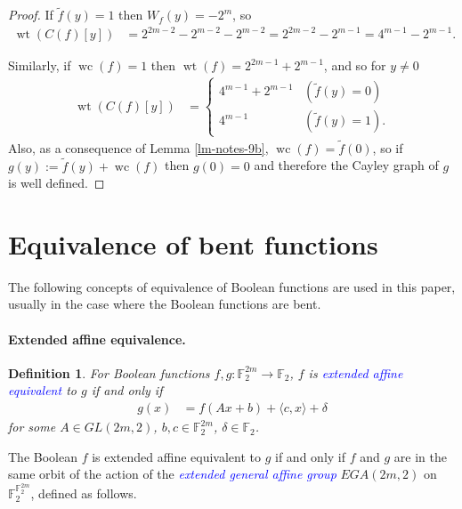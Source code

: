 \documentclass[12pt,a4paper]{article}
\newcommand{\mb}[1]{\mathbb{#1}}
\newcommand{\F}{\mb{F}}
\newcommand{\To}{\rightarrow}
\newcommand{\Emph}[1]{\emph{\textcolor{blue}{#1}}}
\newcommand{\dual}[1]{\widetilde{#1}}
\newcommand{\weight}[1]{\operatorname{wt}\left(#1\right)}
\newcommand{\weightclass}[1]{\operatorname{wc}\left(#1\right)}
\newtheorem{Definition}{Definition}
\begin{document}
\begin{proof}
If $\dual{f}(y) = 1$ then $W_f(y) = -2^m$, so
\begin{align*}
\weight{C(f)[y]}
&=
2^{2m-2}-2^{m-2} - 2^{m-2}
=
2^{2m-2} - 2^{m-1}
=
4^{m-1} - 2^{m-1}.
\end{align*}

Similarly, if $\weightclass{f} = 1$ then $\weight{f} = 2^{2m-1}+2^{m-1}$,
and so for $y \neq 0$
\begin{align*}
\weight{C(f)[y]}
&=
\begin{cases}
4^{m-1} + 2^{m-1} & (\dual{f}(y)=0)
\\
4^{m-1}           & (\dual{f}(y)=1).
\end{cases}
\end{align*}
Also, as a consequence of Lemma \ref{lm-notes-9b}, $\weightclass{f} = \dual{f}(0)$,
so if $g(y) := \dual{f}(y) + \weightclass{f}$ then $g(0)=0$ and therefore the Cayley graph of $g$
is well defined.
\end{proof}

\section{Equivalence of bent functions}
\label{sec-Equivalence}
The following concepts of equivalence of Boolean functions are used in this paper,
usually in the case where the Boolean functions are bent.

\paragraph*{Extended affine equivalence.}

\begin{Definition}
For Boolean functions $f,g : \F_2^{2m} \To \F_2$,
$f$ is \Emph{extended affine equivalent} to $g$ \cite[Section 1.4]{Tok15bent} if and only if
\begin{align*}
g(x) &= f(A x + b) + \langle c, x \rangle + \delta
\end{align*}
for some $A \in GL(2m,2)$, $b, c \in \F_2^{2m}$, $\delta \in \F_2$.
\end{Definition}

The Boolean $f$ is extended affine equivalent to $g$
if and only if $f$ and $g$ are in the same orbit
of the action of the \Emph{extended general affine group} $EGA(2m, 2)$ on $\F_2^{\F_2^{2m}}$, defined as follows.
\end{document}
